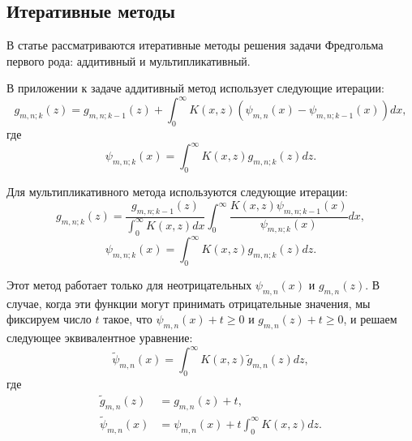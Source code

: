\documentclass[../paper.tex]{subfiles}
\begin{document}
\subsection{Итеративные методы}
В статье \cite{fredholm-integrals} рассматриваются итеративные методы решения задачи Фредгольма
первого рода: аддитивный и мультипликативный.

В приложении к задаче аддитивный метод использует следующие итерации:
\[
	g_{m,n;k}(z) = g_{m,n;k-1}(z) + \int_0^\infty K(x, z) (\psi_{m,n}(x) - \psi_{m,n;k-1}(x)) dx
,\]
где
\[
	\psi_{m,n;k}(x) = \int_0^\infty K(x, z) g_{m,n;k}(z) dz
.\]

Для мультипликативного метода используются следующие итерации:
\[
	g_{m,n;k}(z) = \frac{g_{m,n;k-1}(z)}{\int_{0}^\infty K(x, z) dx} \int_{0}^\infty \frac{K(x, z) \psi_{m,n;k-1}(x)}{\psi_{m,n;k}(x)} dx
,\]
\[
	\psi_{m,n;k}(x) = \int_0^\infty K(x, z) g_{m,n;k}(z) dz
.\]

Этот метод работает только для неотрицательных $\psi_{m,n}(x)$ и $g_{m,n}(z)$.
В случае, когда эти функции могут принимать отрицательные значения,
мы фиксируем число $t$ такое, что $\psi_{m,n}(x) + t \ge 0$ и $g_{m,n}(z) + t \ge 0$,
и решаем следующее эквивалентное уравнение:
\[
	\tilde{\psi}_{m,n}(x) = \int_0^\infty K(x,z) \tilde{g}_{m,n}(z) dz
,\]
где
\begin{align*}
	\tilde{g}_{m,n}(z)    &= g_{m,n}(z) + t,\\
	\tilde{\psi}_{m,n}(x) &= \psi_{m,n}(x) + t \int_0^\infty K(x,z) dz.
\end{align*}
\end{document}
